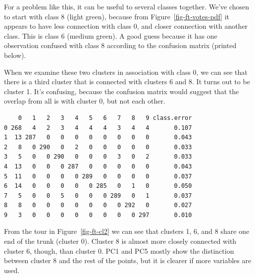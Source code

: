 \documentclass[
  letterpaper,
]{krantz}
\newenvironment{Shaded}{\begin{snugshade}}{\end{snugshade}}
\newcommand{\NormalTok}[1]{\textcolor[rgb]{0.00,0.23,0.31}{#1}}
\newcommand{\SpecialCharTok}[1]{\textcolor[rgb]{0.37,0.37,0.37}{#1}}
\begin{document}
For a problem like this, it can be useful to several classes together.
We've chosen to start with class 8 (light green), because from
Figure~\ref{fig-ft-votes-pdf} it appears to have less connection with
class 0, and closer connection with another class. This is class 6
(medium green). A good guess because it has one observation confused
with class 8 according to the confusion matrix (printed below).

When we examine these two clusters in association with class 0, we can
see that there is a third cluster that is connected with clusters 6 and
8. It turns out to be cluster 1. It's confusing, because the confusion
matrix would suggest that the overlap from all is with cluster 0, but
not each other.

\begin{Shaded}
\end{Shaded}

\begin{verbatim}
    0   1   2   3   4   5   6   7   8   9 class.error
0 268   4   2   3   4   4   4   3   4   4       0.107
1  13 287   0   0   0   0   0   0   0   0       0.043
2   8   0 290   0   2   0   0   0   0   0       0.033
3   5   0   0 290   0   0   0   3   0   2       0.033
4  13   0   0   0 287   0   0   0   0   0       0.043
5  11   0   0   0   0 289   0   0   0   0       0.037
6  14   0   0   0   0   0 285   0   1   0       0.050
7   5   0   0   5   0   0   0 289   0   1       0.037
8   8   0   0   0   0   0   0   0 292   0       0.027
9   3   0   0   0   0   0   0   0   0 297       0.010
\end{verbatim}

From the tour in Figure~\ref{fig-ft-cl2} we can see that clusters 1, 6,
and 8 share one end of the trunk (cluster 0). Cluster 8 is almost more
closely connected with cluster 6, though, than cluster 0. PC1 and PC5
mostly show the distinction between cluster 8 and the rest of the
points, but it is clearer if more variables are used.
\end{document}
